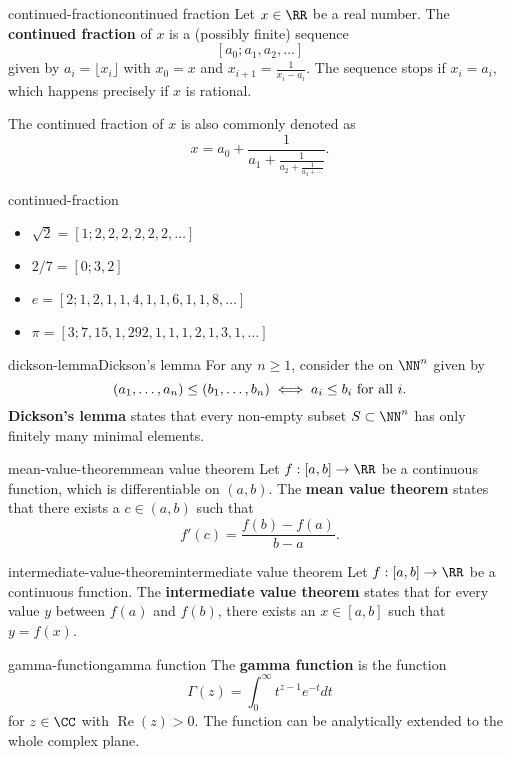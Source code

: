 \begin{topic}{continued-fraction}{continued fraction}
    Let $x \in \RR$ be a real number. The \textbf{continued fraction} of $x$ is a (possibly finite) sequence
    \[ [a_0; a_1, a_2, \ldots] \]
    given by $a_i = \lfloor x_i \rfloor$ with $x_0 = x$ and $x_{i + 1} = \frac{1}{x_i - a_i}$. The sequence stops if $x_i = a_i$, which happens precisely if $x$ is rational.
    
    The continued fraction of $x$ is also commonly denoted as
    \[ x = a_0 + \frac{1}{a_1 + \frac{1}{a_2 + \frac{1}{a_3 + \cdots }}} . \]
\end{topic}

\begin{example}{continued-fraction}
    \begin{itemize}
        \item $\sqrt{2} = [1; 2, 2, 2, 2, 2, 2, \ldots]$
        \item $2/7 = [0; 3, 2]$
        \item $e = [2; 1, 2, 1, 1, 4, 1, 1, 6, 1, 1, 8, \ldots]$
        \item $\pi = [3; 7, 15, 1, 292, 1, 1, 1, 2, 1, 3, 1, \ldots]$
    \end{itemize}
\end{example}

\begin{topic}{dickson-lemma}{Dickson's lemma}
    For any $n \ge 1$, consider the  on $\NN^n$ given by
    \[ (a_1, \ldots, a_n) \le (b_1, \ldots, b_n) \iff a_i \le b_i \textup{ for all } i . \]
    \textbf{Dickson's lemma} states that every non-empty subset $S \subset \NN^n$ has only finitely many minimal elements.
\end{topic}

\begin{topic}{mean-value-theorem}{mean value theorem}
    Let $f : [a, b] \to \RR$ be a continuous function, which is differentiable on $(a, b)$. The \textbf{mean value theorem} states that there exists a $c \in (a, b)$ such that
    \[ f'(c) = \frac{f(b) - f(a)}{b - a} . \]
\end{topic}

\begin{topic}{intermediate-value-theorem}{intermediate value theorem}
    Let $f : [a, b] \to \RR$ be a continuous function. The \textbf{intermediate value theorem} states that for every value $y$ between $f(a)$ and $f(b)$, there exists an $x \in [a, b]$ such that $y = f(x)$.
\end{topic}

\begin{topic}{gamma-function}{gamma function}
    The \textbf{gamma function} is the function
    \[ \Gamma(z) = \int_0^\infty t^{z - 1} e^{-t} dt \]
    for $z \in \CC$ with $\operatorname{Re}(z) > 0$. The function can be analytically extended to the whole complex plane.
\end{topic}
